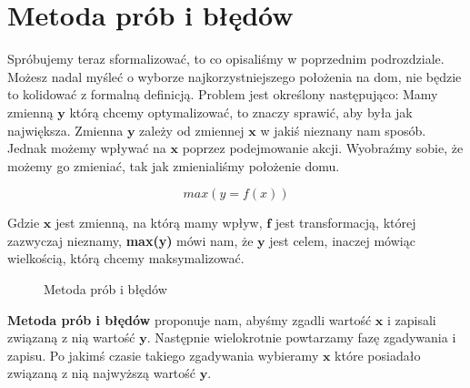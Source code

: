 \section{Metoda prób i błędów}

Spróbujemy teraz sformalizować, to co opisaliśmy w poprzednim podrozdziale. \break Możesz nadal myśleć o wyborze najkorzystniejszego położenia na dom, nie będzie to kolidować z formalną definicją. Problem jest określony następująco: Mamy zmienną $\boldsymbol{y}$ którą chcemy optymalizować, to znaczy sprawić, aby była jak największa. Zmienna $\boldsymbol{y}$ zależy od zmiennej $\boldsymbol{x}$ w jakiś nieznany nam sposób. Jednak możemy wpływać na $\boldsymbol{x}$ poprzez podejmowanie akcji. Wyobraźmy sobie, że możemy go zmieniać, tak jak zmienialiśmy położenie domu.\newline

\begin{equation}
max(y = f(x))
\end{equation}

Gdzie $\boldsymbol{x}$ jest zmienną, na którą mamy wpływ, $\boldsymbol{f}$ jest transformacją, której zazwyczaj nieznamy, \textbf{max(y)} mówi nam, że $\boldsymbol{y}$ jest celem, inaczej mówiąc wielkością, którą chcemy maksymalizować.\newline

\clearpage
\begin{figure}[H]

\caption{Metoda prób i błędów}
\centering
\end{figure}
\clearpage

\textbf{Metoda prób i błędów} proponuje nam, abyśmy zgadli wartość $\boldsymbol{x}$ i zapisali związaną z nią wartość $\boldsymbol{y}$. Następnie wielokrotnie powtarzamy fazę zgadywania i zapisu. Po jakimś czasie takiego zgadywania wybieramy $\boldsymbol{x}$ które posiadało związaną z nią najwyższą wartość $\boldsymbol{y}$.\newline

